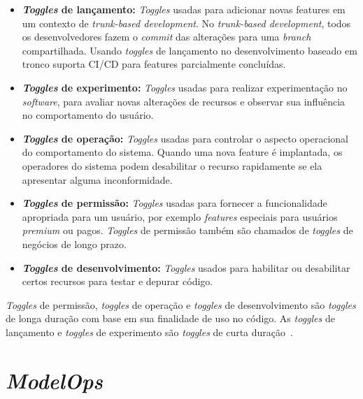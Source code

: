 \documentclass[portugues]{ic-tese}
\begin{document}
\begin{itemize}
\item \textbf{\textit{Toggles} de lançamento:} \textit{Toggles} usadas para adicionar novas features em um contexto de \textit{trunk-based development}. No \textit{trunk-based development}, todos os desenvolvedores fazem o \textit{commit} das alterações para uma \textit{branch} compartilhada. Usando \textit{toggles} de lançamento no desenvolvimento baseado em tronco suporta CI/CD para features parcialmente concluídas.
\item \textbf{\textit{Toggles} de experimento:} \textit{Toggles} usadas para realizar experimentação no \textit{software}, para avaliar novas alterações de recursos e observar sua influência no comportamento do usuário.
\item \textbf{\textit{Toggles} de operação:} \textit{Toggles} usadas para controlar o aspecto operacional do comportamento do sistema. Quando uma nova feature é implantada, os operadores do sistema podem desabilitar o recurso rapidamente se ela apresentar alguma inconformidade.
\item \textbf{\textit{Toggles} de permissão:} \textit{Toggles} usadas para fornecer a funcionalidade apropriada para um usuário, por exemplo \textit{features} especiais para usuários \textit{premium} ou pagos. \textit{Toggles} de permissão também são chamados de \textit{toggles} de negócios de longo prazo.
\item \textbf{\textit{Toggles} de desenvolvimento:} \textit{Toggles} usados para habilitar ou desabilitar certos recursos para testar e depurar código.
\end{itemize}

\textit{Toggles} de permissão, \textit{toggles} de operação e \textit{toggles} de desenvolvimento são \textit{toggles} de longa duração com base em sua finalidade de uso no código. As \textit{toggles} de lançamento e \textit{toggles} de experimento são \textit{toggles} de curta duração~\citep{Mahdavi-hezaveh_2021}.

\section{\textit{ModelOps}}
\label{app:ModelOps}
\end{document}
